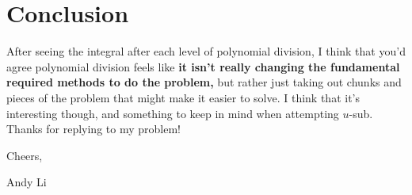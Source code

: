 \documentclass[letterpaper, 12pt]{article}
\begin{document}
\section{Conclusion}
After seeing the integral after each level of polynomial division, I think that you'd agree polynomial division feels like \textbf{it isn't really changing the fundamental required methods to do the problem,} but rather just taking out chunks and pieces of the problem that might make it easier to solve. I think that it's interesting though, and something to keep in mind when attempting $u$-sub. Thanks for replying to my problem!\par
Cheers,\par
Andy Li
\end{document}
